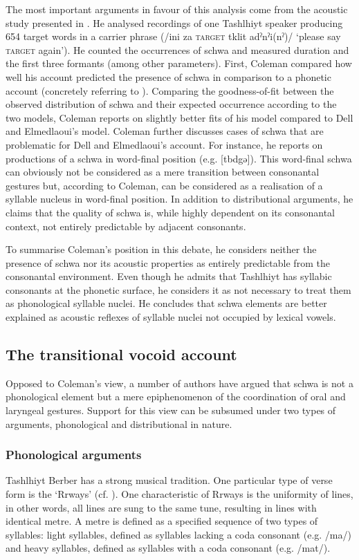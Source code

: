 The most important arguments in favour of this analysis come from the acoustic study presented in \citet{Coleman2001}. He analysed recordings of one Tashlhiyt speaker producing 654 target words in a carrier phrase (/ini za \textsc{target} tklit adˀnˀi(nˀ)/ ‘please say \textsc{target} again’). He counted the occurrences of schwa and measured duration and the first three formants (among other parameters). First, Coleman compared how well his account predicted the presence of schwa in comparison to a phonetic account (concretely referring to \citealt{DE1996}). Comparing the goodness-of-fit between the observed distribution of schwa and their expected occurrence according to the two models, Coleman reports on slightly better fits of his model compared to Dell and Elmedlaoui’s model. Coleman further discusses cases of schwa that are problematic for Dell and Elmedlaoui’s account. For instance, he reports on productions of a schwa in word-final position (e.g. [tbdgə]). This word-final schwa can obviously not be considered as a mere transition between consonantal gestures but, according to Coleman, can be considered as a realisation of a syllable nucleus in word-final position. In addition to distributional arguments, he claims that the quality of schwa is, while highly dependent on its consonantal context, not entirely predictable by adjacent consonants. 

To summarise Coleman’s position in this debate, he considers neither the presence of schwa nor its acoustic properties as entirely predictable from the consonantal environment. Even though he admits that Tashlhiyt has syllabic consonants at the phonetic surface, he considers it as not necessary to treat them as phonological syllable nuclei. He concludes that schwa elements are better explained as acoustic reflexes of syllable nuclei not occupied by lexical vowels. 

\largerpage
\subsection{The transitional vocoid account}
Opposed to Coleman’s view, a number of authors have argued that schwa is not a phonological element but a mere epiphenomenon of the coordination of oral and laryngeal gestures. Support for this view can be subsumed under two types of arguments, phonological and distributional in nature. 

\subsubsection{Phonological arguments}
Tashlhiyt Berber has a strong musical tradition. One particular type of verse form is the ‘Rrways’ (cf. \citealt{schuyler1979}). One characteristic of Rrways is the uniformity of lines, in other words, all lines are sung to the same tune, resulting in lines with identical metre. A metre is defined as a specified sequence of two types of syllables: light syllables, defined as syllables lacking a coda consonant (e.g. /ma/) and heavy syllables, defined as syllables with a coda consonant (e.g. /mat/). 

